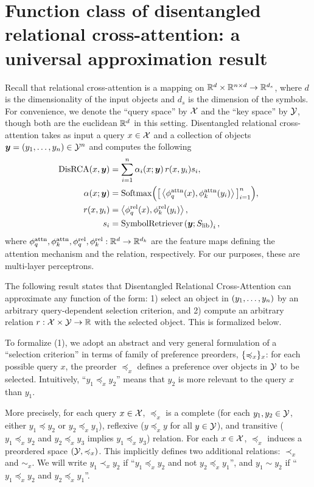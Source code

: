 \section{Function class of disentangled relational cross-attention: a universal approximation result}

Recall that relational cross-attention is a mapping on $\mathbb{R}^d \times \mathbb{R}^{n \times d} \to \mathbb{R}^{d_s}$, where $d$ is the dimensionality of the input objects and $d_s$ is the dimension of the symbols. For convenience, we denote the ``query space'' by ${\mathcal{X}}$ and the ``key space'' by ${\mathcal{Y}}$, though both are the euclidean $\mathbb{R}^d$ in this setting. Disentangled relational cross-attention takes as input a query $x \in {\mathcal{X}}$ and a collection of objects $\bm{y} = (y_1, \ldots, y_n) \in {\mathcal{Y}}^n$ and computes the following
\begin{align}
  \mathrm{DisRCA}(x, \bm{y}) &= \sum_{i=1}^{n} \alpha_i(x; \bm{y}) \, r(x, y_i) s_i, \\
  \alpha(x; \bm{y}) &= \mathrm{Softmax}\Big(\big[\left \langle \phi_q^{\mathrm{attn}}(x), \phi_k^{\mathrm{attn}}(y_i) \right\rangle\big]_{i=1}^{n}\Big), \\
  r(x, y_i) &= \left \langle \phi_q^{\mathrm{rel}}(x), \phi_k^{\mathrm{rel}}(y_i) \right\rangle, \\
  s_i &= \mathrm{SymbolRetriever}\left(\bm{y}; S_\mathrm{lib}\right)_i,
\end{align}
where $\phi_q^{\mathrm{attn}}, \phi_k^{\mathrm{attn}}, \phi_q^{\mathrm{rel}}, \phi_k^{\mathrm{rel}}: \mathbb{R}^{d} \to \mathbb{R}^{d_k}$ are the feature maps defining the attention mechanism and the relation, respectively. For our purposes, these are multi-layer perceptrons.

The following result states that Disentangled Relational Cross-Attention can approximate any function of the form: 1) select an object in $(y_1, \ldots, y_n)$ by an arbitrary query-dependent selection criterion, and 2) compute an arbitrary relation $r: {\mathcal{X}} \times {\mathcal{Y}} \to \mathbb{R}$ with the selected object. This is formalized below.

To formalize (1), we adopt an abstract and very general formulation of a ``selection criterion'' in terms of family of preference preorders, $\{\preccurlyeq_x\}_x$: for each possible query $x$, the preorder $\preceq_x$ defines a preference over objects in ${\mathcal{Y}}$ to be selected. Intuitively, ``$y_1 \preceq_x y_2$'' means that $y_2$ is more relevant to the query $x$ than $y_1$.

More precisely, for each query $x \in {\mathcal{X}}$, $\preceq_x$ is a complete (for each $y_1, y_2 \in {\mathcal{Y}}$, either $y_1 \preceq y_2$ or $y_2 \preceq_x y_1$), reflexive ($y \preceq_x y$ for all $y \in {\mathcal{Y}}$), and transitive ($y_1 \preceq_x y_2$ and $y_2 \preceq_x y_3$ implies $y_1 \preceq_x y_3$) relation. For each $x \in {\mathcal{X}}$, $\preceq_x$ induces a preordered space $({\mathcal{Y}}, \preccurlyeq_x)$. This implicitly defines two additional relations: $\prec_x$ and $\sim_x$. We will write $y_1 \prec_x y_2$ if ``$y_1 \preceq_x y_2$ and not $y_2 \preceq_x y_1$'', and $y_1 \sim y_2$ if ``$y_1 \preceq_x y_2$ and $y_2 \preceq_x y_1$''.

